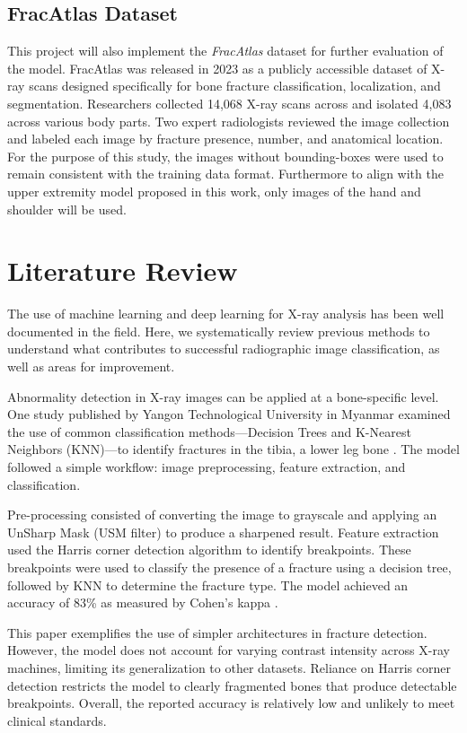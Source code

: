 \documentclass[conference]{IEEEtran}
\begin{document}
\subsection{FracAtlas Dataset}

This project will also implement the \textit{FracAtlas} dataset for further evaluation of the model. FracAtlas was released in 2023 as a publicly accessible dataset of X-ray scans designed specifically for bone fracture classification, localization, and segmentation. Researchers collected 14{,}068 X-ray scans across and isolated 4{,}083  across various body parts. Two expert radiologists reviewed the image collection and labeled each image by fracture presence, number, and anatomical location. For the purpose of this study, the images without bounding-boxes were used to remain consistent with the training data format. Furthermore to align with the upper extremity model proposed in this work, only images of the hand and shoulder will be used. 
    
\section{Literature Review}

The use of machine learning and deep learning for X-ray analysis has been well documented in the field. Here, we systematically review previous methods to understand what contributes to successful radiographic image classification, as well as areas for improvement.

Abnormality detection in X-ray images can be applied at a bone-specific level. One study published by Yangon Technological University in Myanmar examined the use of common classification methods—Decision Trees and K-Nearest Neighbors (KNN)—to identify fractures in the tibia, a lower leg bone \cite{Myint2018LegFracture}. The model followed a simple workflow: image preprocessing, feature extraction, and classification.

Pre-processing consisted of converting the image to grayscale and applying an UnSharp Mask (USM filter) to produce a sharpened result. Feature extraction used the Harris corner detection algorithm to identify breakpoints. These breakpoints were used to classify the presence of a fracture using a decision tree, followed by KNN to determine the fracture type. The model achieved an accuracy of 83\% as measured by Cohen’s kappa \cite{Myint2018LegFracture}.

This paper exemplifies the use of simpler architectures in fracture detection. However, the model does not account for varying contrast intensity across X-ray machines, limiting its generalization to other datasets. Reliance on Harris corner detection restricts the model to clearly fragmented bones that produce detectable breakpoints. Overall, the reported accuracy is relatively low and unlikely to meet clinical standards.
\end{document}
